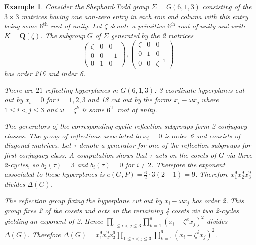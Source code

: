 \documentclass[12pt]{amsart}
\renewcommand{\leq}{\leqslant}
\newcommand{\QQ}{\mathbf{Q}} %
\newcommand{\QQ}{\mathbb{Q}} %
\newtheorem{example}[thm]{Example}
\theoremstyle{definition}
\begin{document}
\begin{example}\label{ex:G-disc}
Consider the Shephard-Todd group $\Sigma = G(6,1,3)$   
consisting of the $3\times 3$ matrices  having one non-zero entry in each row and column with this entry being some $6^\text{th}$ root of unity. 
Let $\zeta$ denote a primitive $6^\text{th}$ root of unity and write
$K = \QQ(\zeta)$.
The subgroup $G$ of $\Sigma$ generated by the 2 matrices
$$ \begin{pmatrix}\zeta&0&0\\ 0&0&-1\\ 0&1&0\end{pmatrix},
\begin{pmatrix}\zeta&0&0\\ 0&1&0\\ 0&0&\zeta^{-1}\end{pmatrix}
$$ has order 216 and index 6. 


There are $21$ reflecting hyperplanes in $G(6,1,3)$:
3 coordinate hyperplanes cut out by $x_i=0$ for $i=1,2,3$
and 18 cut out by the forms $x_i - \omega x_j$ where $1 \leq i < j \leq 3$
and $\omega=\zeta^k$ is some $6^\text{th}$ root of unity. 

The generators of the corresponding cyclic reflection subgroups form 2 conjugacy classes.
The group of reflections associated to $x_i=0$ is order 6 and consists
of diagonal matrices.  Let $\tau$ denote a generator for one of the reflection subgroups for first conjugacy class.  
A computation shows that 
$\tau$ acts on the cosets of $G$ via three 2-cycles, so $b_2(\tau)=3$ and
$b_i(\tau)=0$ for $i \neq 2$.
Therefore the exponent associated to these hyperplanes is 
$e(G,P)= \frac{6}{2}\cdot 3 (2-1) = 9$.
Therefore $x_1^9 x_2^9 x_3^9$ divides $\Delta(G)$.



The reflection group fixing the hyperplane cut out by $x_i - \omega x_j$ has order 2.  This group fixes 2 of the cosets and acts on the remaining 4 
cosets via two 2-cycles yielding an exponent of 2.
  Hence 
$\prod_{1\leq i < j\leq 3} \prod_{k=1}^6 (x_i - \zeta^k x_j)^2$ divides $\Delta(G)$.
Therefore $\Delta(G) = x_1^9 x_2^9 x_3^9 \prod_{1\leq i < j\leq 3} \prod_{k=1}^6 (x_i - \zeta^k x_j)^2$.
\end{example}
\end{document}
